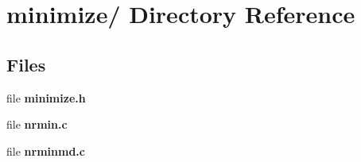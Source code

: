 \section{minimize/ Directory Reference}
\label{dir_8b63dbcfde652a5be6f5d55266742a22}
\subsection*{Files}
\begin{CompactItemize}
\item 
file {\bf minimize.h}
\item 
file {\bf nrmin.c}
\item 
file {\bf nrminmd.c}
\end{CompactItemize}
